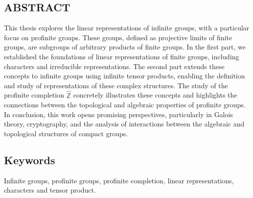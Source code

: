\documentclass[a4paper, 14pt]{report}
\newcommand{\applyfontsize}{%
	\fontsize{12}{12}\selectfont
}
\begin{document}
\begin{onehalfspace}
\chapter*{ABSTRACT}
{
	\applyfontsize %
This thesis explores the linear representations of infinite groups, with a particular focus on profinite groups. These groups, defined as projective limits of finite groups, are subgroups of arbitrary products of finite groups. In the first part, we established the foundations of linear representations of finite groups, including characters and irreducible representations. The second part extends these concepts to infinite groups using infinite tensor products, enabling the definition and study of representations of these complex structures. The study of the profinite completion \( \widehat{\mathbb{Z}} \)
concretely illustrates these concepts and highlights the connections between the topological and algebraic properties of profinite groups. In conclusion, this work opens promising perspectives, particularly in Galois theory, cryptography, and the analysis of interactions between the algebraic and topological structures of compact groups.



\section*{Keywords}
Infinite groups, profinite groups, profinite completion, linear representations, characters and tensor product.
	
}






\end{onehalfspace}
\end{document}
